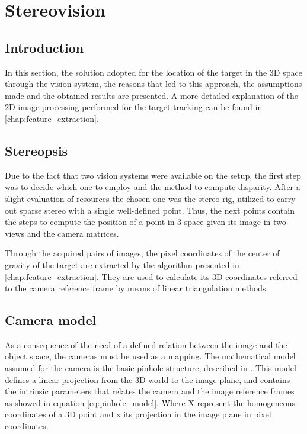 
\chapter{Stereovision} %
\label{chap:stereopsis}

\section{Introduction}
In this section, the solution adopted for the location of the target in the 3D space through the vision system, the reasons that led to this approach, the assumptions made and the obtained results are presented. 
A more detailed explanation of the 2D image processing performed for the target tracking can be found in \ref{chap:feature_extraction}.

\section{Stereopsis}
Due to the fact that two vision systems were available on the setup, the first step was to decide which one to employ and the method to compute disparity. 
After a slight evaluation of resources the chosen one was the stereo rig, utilized to carry out sparse stereo with a single well-defined point. 
Thus, the next points contain the steps to compute the position of a point in 3-space given its image in two views and the camera matrices. 

Through the acquired pairs of images, the pixel coordinates of the center of gravity of the target are extracted by the algorithm presented in \ref{chap:feature_extraction}. They are used to calculate its 3D coordinates referred to the camera reference frame by means of linear triangulation methods.

\section{Camera model}
As a consequence of the need of a defined relation between the image and the object space, the cameras must be used as a mapping. 
The mathematical model assumed for the camera is the basic pinhole structure, described in \cite{Hartley}. 
This model defines a linear projection from the 3D world to the image plane, and contains the intrinsic parameters that relates the camera and the image reference frames as showed in equation \ref{eq:pinhole_model}. Where X represent the homogeneous coordinates of a 3D point and x its projection in the image plane in pixel coordinates.
 
